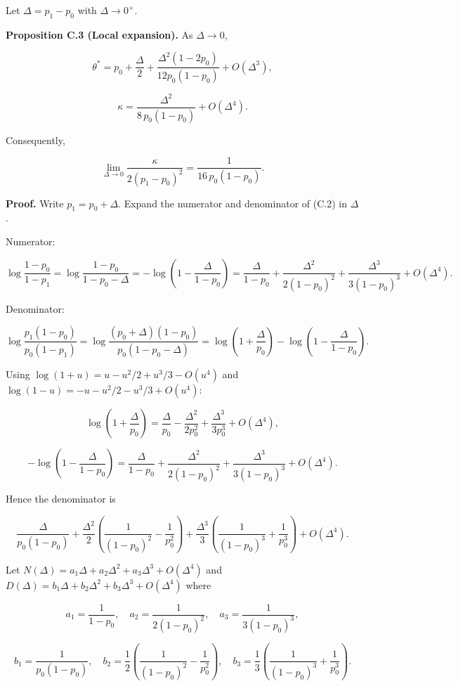 \documentclass[
  12pt,
]{article}
\begin{document}
Let \(\Delta = p_1 - p_0\) with \(\Delta \to 0^+\).

\textbf{Proposition C.3 (Local expansion).} As \(\Delta \to 0\),

\[
\theta^* = p_0 + \frac{\Delta}{2} + \frac{\Delta^2(1-2p_0)}{12 p_0(1-p_0)} + O(\Delta^3),
\]

\[
\kappa = \frac{\Delta^2}{8\,p_0(1-p_0)} + O(\Delta^4).
\]

Consequently,

\[
\lim_{\Delta\to 0} \frac{\kappa}{2(p_1-p_0)^2} = \frac{1}{16\,p_0(1-p_0)}.
\]

\textbf{Proof.} Write \(p_1 = p_0 + \Delta\). Expand the numerator and
denominator of (C.2) in \(\Delta\).

Numerator:

\[
\log\frac{1-p_0}{1-p_1} = \log\frac{1-p_0}{1-p_0-\Delta}
= -\log\!\left(1 - \frac{\Delta}{1-p_0}\right)
= \frac{\Delta}{1-p_0} + \frac{\Delta^2}{2(1-p_0)^2} + \frac{\Delta^3}{3(1-p_0)^3} + O(\Delta^4).
\]

Denominator:

\[
\log\frac{p_1(1-p_0)}{p_0(1-p_1)}
= \log\frac{(p_0+\Delta)(1-p_0)}{p_0(1-p_0-\Delta)}
= \log\!\left(1+\frac{\Delta}{p_0}\right) - \log\!\left(1-\frac{\Delta}{1-p_0}\right).
\]

Using \(\log(1+u) = u - u^2/2 + u^3/3 - O(u^4)\) and
\(\log(1-u) = -u - u^2/2 - u^3/3 + O(u^4)\):

\[
\log\!\left(1+\frac{\Delta}{p_0}\right) = \frac{\Delta}{p_0} - \frac{\Delta^2}{2p_0^2} + \frac{\Delta^3}{3p_0^3} + O(\Delta^4),
\]

\[
-\log\!\left(1-\frac{\Delta}{1-p_0}\right) = \frac{\Delta}{1-p_0} + \frac{\Delta^2}{2(1-p_0)^2} + \frac{\Delta^3}{3(1-p_0)^3} + O(\Delta^4).
\]

Hence the denominator is

\[
\frac{\Delta}{p_0(1-p_0)} + \frac{\Delta^2}{2}\!\left(\frac{1}{(1-p_0)^2} - \frac{1}{p_0^2}\right) + \frac{\Delta^3}{3}\!\left(\frac{1}{(1-p_0)^3} + \frac{1}{p_0^3}\right) + O(\Delta^4).
\]

Let \(N(\Delta) = a_1\Delta + a_2\Delta^2 + a_3\Delta^3 + O(\Delta^4)\)
and \(D(\Delta) = b_1\Delta + b_2\Delta^2 + b_3\Delta^3 + O(\Delta^4)\)
where

\[
a_1 = \frac{1}{1-p_0},\quad
a_2 = \frac{1}{2(1-p_0)^2},\quad
a_3 = \frac{1}{3(1-p_0)^3},
\]

\[
b_1 = \frac{1}{p_0(1-p_0)},\quad
b_2 = \frac{1}{2}\!\left(\frac{1}{(1-p_0)^2} - \frac{1}{p_0^2}\right),\quad
b_3 = \frac{1}{3}\!\left(\frac{1}{(1-p_0)^3} + \frac{1}{p_0^3}\right).
\]
\end{document}
